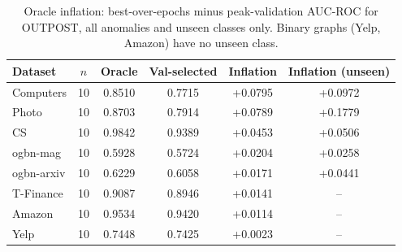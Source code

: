 \begin{table}[t]
\centering
\small
\begin{tabular}{lccccc}
\toprule
Dataset & $n$ & Oracle & Val-selected & Inflation & Inflation (unseen) \\
\midrule
Computers & 10 & 0.8510 & 0.7715 & +0.0795 & +0.0972 \\
Photo & 10 & 0.8703 & 0.7914 & +0.0789 & +0.1779 \\
CS & 10 & 0.9842 & 0.9389 & +0.0453 & +0.0506 \\
ogbn-mag & 10 & 0.5928 & 0.5724 & +0.0204 & +0.0258 \\
ogbn-arxiv & 10 & 0.6229 & 0.6058 & +0.0171 & +0.0441 \\
T-Finance & 10 & 0.9087 & 0.8946 & +0.0141 & -- \\
Amazon & 10 & 0.9534 & 0.9420 & +0.0114 & -- \\
Yelp & 10 & 0.7448 & 0.7425 & +0.0023 & -- \\
\bottomrule
\end{tabular}
\caption{Oracle inflation: best-over-epochs minus peak-validation AUC-ROC for OUTPOST, all anomalies and unseen classes only. Binary graphs (Yelp, Amazon) have no unseen class.}
\label{tab:inflation}
\end{table}
